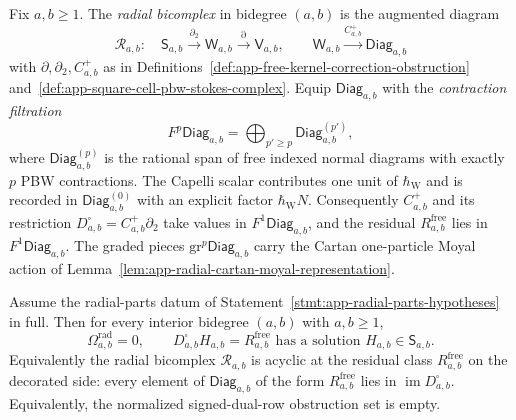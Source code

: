 \begin{defn}
\label{def:app-radial-bicomplex}
  Fix \(a,b\geq1\).  The \emph{radial bicomplex} in bidegree \((a,b)\)
  is the augmented diagram
  \[
    \mathcal R_{a,b}\colon\quad
    \mathsf S_{a,b}
      \xrightarrow{\partial_2}
    \mathsf W_{a,b}
      \xrightarrow{\partial}
    \mathsf V_{a,b},
    \qquad
    \mathsf W_{a,b}\xrightarrow{C^+_{a,b}}\mathsf{Diag}_{a,b}
  \]
  with \(\partial,\partial_2,C^+_{a,b}\) as in
  Definitions~\ref{def:app-free-kernel-correction-obstruction}
  and~\ref{def:app-square-cell-pbw-stokes-complex}.  Equip
  \(\mathsf{Diag}_{a,b}\) with the \emph{contraction filtration}
  \[
    F^p\mathsf{Diag}_{a,b}=\bigoplus_{p'\geq p}\mathsf{Diag}_{a,b}^{(p')},
  \]
  where \(\mathsf{Diag}_{a,b}^{(p)}\) is the rational span of free
  indexed normal diagrams with exactly \(p\) PBW contractions.  The
  Capelli scalar contributes one unit of \(\hbar_{\mathrm{W}}\) and is recorded in
  \(\mathsf{Diag}_{a,b}^{(0)}\) with an explicit factor \(\hbar_{\mathrm{W}} N\).
  Consequently \(C^+_{a,b}\) and its restriction
  \(D^\square_{a,b}=C^+_{a,b}\partial_2\) take values in
  \(F^1\mathsf{Diag}_{a,b}\), and the residual
  \(R^{\mathrm{free}}_{a,b}\) lies in \(F^1\mathsf{Diag}_{a,b}\).  The
  graded pieces \(\mathrm{gr}^p\mathsf{Diag}_{a,b}\) carry the Cartan
  one-particle Moyal action of
  Lemma~\ref{lem:app-radial-cartan-moyal-representation}.
\end{defn}

\begin{thm}
\label{thm:app-radial-bicomplex-acyclic}
  Assume the radial-parts datum of
  Statement~\ref{stmt:app-radial-parts-hypotheses} in full.
  Then for every interior bidegree \((a,b)\) with \(a,b\geq1\),
  \[
    \Omega^{\mathrm{rad}}_{a,b}=0,
    \qquad
    D^\square_{a,b}H_{a,b}=R^{\mathrm{free}}_{a,b}
    \text{ has a solution }H_{a,b}\in\mathsf S_{a,b}.
  \]
  Equivalently the radial bicomplex \(\mathcal R_{a,b}\) is acyclic
  at the residual class \(R^{\mathrm{free}}_{a,b}\) on the decorated
  side: every element of \(\mathsf{Diag}_{a,b}\) of the form
  \(R^{\mathrm{free}}_{a,b}\) lies in
  \(\operatorname{im}D^\square_{a,b}\).  Equivalently, the normalized
  signed-dual-row obstruction set is empty.
\end{thm}


